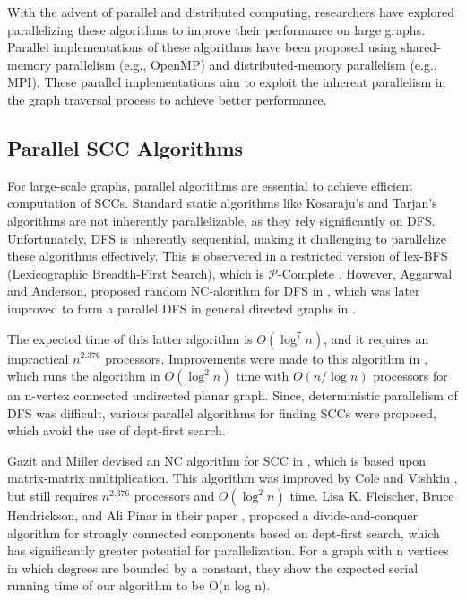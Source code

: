 With the advent of parallel and distributed computing, researchers have explored parallelizing these algorithms to improve their performance on large graphs. Parallel implementations of these algorithms have been proposed using shared-memory parallelism (e.g., OpenMP) and distributed-memory parallelism (e.g., MPI). These parallel implementations aim to exploit the inherent parallelism in the graph traversal process to achieve better performance.

\subsection{Parallel SCC Algorithms} \label{SubSec: Parallel SCC Algorithms}

For large-scale graphs, parallel algorithms are essential to achieve efficient computation of SCCs. 
Standard static algorithms like Kosaraju's and Tarjan's algorithms are not inherently parallelizable, as they rely significantly on DFS.
Unfortunately, DFS is inherently sequential, making it challenging to parallelize these algorithms effectively.
This is observered in a restricted version of lex-BFS (Lexicographic Breadth-First Search), which is $\mathcal{P}$-Complete \cite{dfs_inherently_sequential}.
However, Aggarwal and Anderson, proposed random NC-alorithm for DFS in \cite[1988]{anderson1988random}, which was later improved to form 
a parallel DFS in general directed graphs in \cite[1990]{doi:10.1137/0219025}.

The expected time of this latter algorithm is $O(\log^7 n)$, and it requires an impractical $n^{2.376}$ processors.
Improvements were made to this algorithm in \cite[1993]{imp_parallel_dfs}, which runs the algorithm in $O(\log^2 n)$ time with $O(n/\log n)$ processors for an n-vertex connected undirected planar graph.
Since, deterministic parallelism of DFS was difficult, various parallel algorithms for finding SCCs were proposed, which avoid the use of dept-first search.

Gazit and Miller devised an NC algorithm for SCC in \cite{GaMi88}, which is based upon matrix-matrix multiplication.
This algorithm was improved by Cole and Vishkin \cite{4c34febb0a66409c8c7877404792c105}, but still requires $n^{2.376}$ processors and $O(\log^2 n)$ time.
Lisa K. Fleischer, Bruce Hendrickson, and Ali Pinar in their paper \cite{10.1007/3-540-45591-4_68}, proposed a divide-and-conquer algorithm for strongly connected components based on dept-first search, which has significantly greater potential for parallelization. 
For a graph with n vertices in which degrees are bounded by a constant, they show the expected serial running time of our algorithm to be O(n log n).

